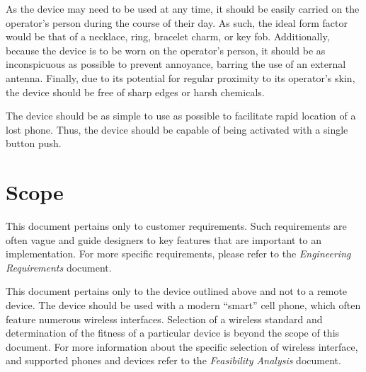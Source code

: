 \documentclass[twoside]{article}
\begin{document}
As the device may need to be used at any time, it should be easily carried on the operator's person during the course of their day.  As such, the ideal form factor would be that of a necklace, ring, bracelet charm, or key fob.  Additionally, because the device is to be worn on the operator's person, it should be as inconspicuous as possible to prevent annoyance, barring the use of an external antenna.  Finally, due to its potential for regular proximity to its operator's skin, the device should be free of sharp edges or harsh chemicals.

The device should be as simple to use as possible to facilitate rapid location of a lost phone.  Thus, the device should be capable of being activated with a single button push.



\section{Scope}

This document pertains only to customer requirements.  Such requirements are often vague and guide designers to key features that are important to an implementation.  For more specific requirements, please refer to the \emph{Engineering Requirements} document.

This document pertains only to the device outlined above and not to a remote device.  The device should be used with a modern ``smart'' cell phone, which often feature numerous wireless interfaces.  Selection of a wireless standard and determination of the fitness of a particular device is beyond the scope of this document.  For more information about the specific selection of wireless interface, and supported phones and devices refer to the \emph{Feasibility Analysis} document.


\end{document}
